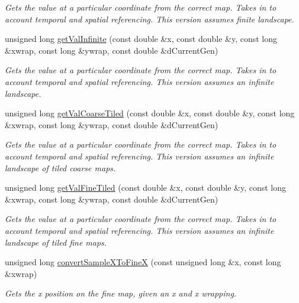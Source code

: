 \begin{DoxyCompactItemize}
\begin{DoxyCompactList}\small\item\em Gets the value at a particular coordinate from the correct map. Takes in to account temporal and spatial referencing. This version assumes finite landscape. \end{DoxyCompactList}\item 
unsigned long \hyperlink{class_map_a9c6f27e30da1fc9e5b47a0709dfdf124}{get\+Val\+Infinite} (const double \&x, const double \&y, const long \&xwrap, const long \&ywrap, const double \&d\+Current\+Gen)
\begin{DoxyCompactList}\small\item\em Gets the value at a particular coordinate from the correct map. Takes in to account temporal and spatial referencing. This version assumes an infinite landscape. \end{DoxyCompactList}\item 
unsigned long \hyperlink{class_map_a4d809944207db362f71257f6cc90e16c}{get\+Val\+Coarse\+Tiled} (const double \&x, const double \&y, const long \&xwrap, const long \&ywrap, const double \&d\+Current\+Gen)
\begin{DoxyCompactList}\small\item\em Gets the value at a particular coordinate from the correct map. Takes in to account temporal and spatial referencing. This version assumes an infinite landscape of tiled coarse maps. \end{DoxyCompactList}\item 
unsigned long \hyperlink{class_map_a5cec27123cd76e08fab2bcb612fc5224}{get\+Val\+Fine\+Tiled} (const double \&x, const double \&y, const long \&xwrap, const long \&ywrap, const double \&d\+Current\+Gen)
\begin{DoxyCompactList}\small\item\em Gets the value at a particular coordinate from the correct map. Takes in to account temporal and spatial referencing. This version assumes an infinite landscape of tiled fine maps. \end{DoxyCompactList}\item 
unsigned long \hyperlink{class_map_a12d17532ea880afc77b729f1005b6e4f}{convert\+Sample\+X\+To\+FineX} (const unsigned long \&x, const long \&xwrap)
\begin{DoxyCompactList}\small\item\em Gets the x position on the fine map, given an x and x wrapping. \end{DoxyCompactList}\item 

\end{DoxyCompactItemize}
